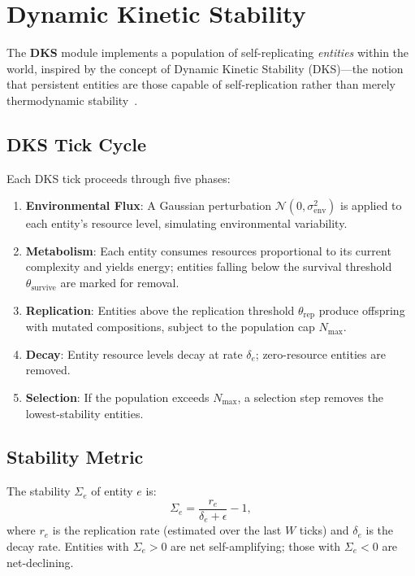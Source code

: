 \documentclass[11pt]{article}
\begin{document}
\section{Dynamic Kinetic Stability}
\label{sec:dks}

The \textbf{DKS} module implements a population of self-replicating
\emph{entities} within the world, inspired by the concept of Dynamic Kinetic
Stability (DKS)---the notion that persistent entities are those capable of
self-replication rather than merely thermodynamic stability~\cite{pross2012}.

\subsection{DKS Tick Cycle}

Each DKS tick proceeds through five phases:

\begin{enumerate}[noitemsep,topsep=4pt]
  \item \textbf{Environmental Flux}: A Gaussian perturbation $\mathcal{N}(0,
        \sigma_{\text{env}}^2)$ is applied to each entity's resource level,
        simulating environmental variability.
  \item \textbf{Metabolism}: Each entity consumes resources proportional to its
        current complexity and yields energy; entities falling below the survival
        threshold $\theta_{\text{survive}}$ are marked for removal.
  \item \textbf{Replication}: Entities above the replication threshold
        $\theta_{\text{rep}}$ produce offspring with mutated compositions, subject
        to the population cap $N_{\text{max}}$.
  \item \textbf{Decay}: Entity resource levels decay at rate $\delta_e$;
        zero-resource entities are removed.
  \item \textbf{Selection}: If the population exceeds $N_{\text{max}}$, a
        selection step removes the lowest-stability entities.
\end{enumerate}

\subsection{Stability Metric}

The stability $\Sigma_e$ of entity $e$ is:
\begin{equation}
  \Sigma_e = \frac{r_e}{\delta_e + \epsilon} - 1,
  \label{eq:dks_stability}
\end{equation}
where $r_e$ is the replication rate (estimated over the last $W$ ticks) and
$\delta_e$ is the decay rate. Entities with $\Sigma_e > 0$ are net self-amplifying;
those with $\Sigma_e < 0$ are net-declining.
\end{document}
